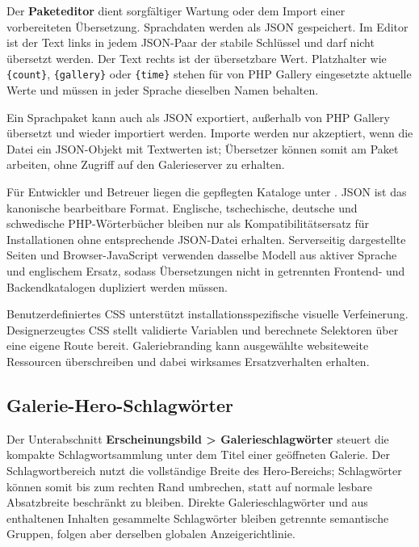 \documentclass[11pt,a4paper]{article}
\newcommand{\filepath}[1]{\path{#1}}
\newcommand{\ui}[1]{\textbf{#1}}
\newcommand{\codeword}[1]{\nolinkurl{#1}}
\begin{document}
Der \ui{Paketeditor} dient sorgfältiger Wartung oder dem Import einer
vorbereiteten Übersetzung. Sprachdaten werden als JSON gespeichert. Im Editor
ist der Text links in jedem JSON-Paar der stabile Schlüssel und darf nicht
übersetzt werden. Der Text rechts ist der übersetzbare Wert. Platzhalter wie
\codeword{\{count\}}, \codeword{\{gallery\}} oder \codeword{\{time\}} stehen für
von PHP Gallery eingesetzte aktuelle Werte und müssen in jeder Sprache dieselben
Namen behalten.

Ein Sprachpaket kann auch als JSON exportiert, außerhalb von PHP Gallery
übersetzt und wieder importiert werden. Importe werden nur akzeptiert, wenn die
Datei ein JSON-Objekt mit Textwerten ist; Übersetzer können somit am Paket
arbeiten, ohne Zugriff auf den Galerieserver zu erhalten.

Für Entwickler und Betreuer liegen die gepflegten Kataloge unter
\filepath{app/lang/}. JSON ist das kanonische bearbeitbare Format. Englische,
tschechische, deutsche und schwedische PHP-Wörterbücher bleiben nur als
Kompatibilitätsersatz für Installationen ohne entsprechende JSON-Datei erhalten.
Serverseitig dargestellte Seiten und Browser-JavaScript verwenden dasselbe
Modell aus aktiver Sprache und englischem Ersatz, sodass Übersetzungen nicht in
getrennten Frontend- und Backendkatalogen dupliziert werden müssen.

Benutzerdefiniertes CSS unterstützt installationsspezifische visuelle
Verfeinerung. Designerzeugtes CSS stellt validierte Variablen und berechnete
Selektoren über eine eigene Route bereit. Galeriebranding kann ausgewählte
websiteweite Ressourcen überschreiben und dabei wirksames Ersatzverhalten
erhalten.

\subsection{Galerie-Hero-Schlagwörter}

Der Unterabschnitt \ui{Erscheinungsbild > Galerieschlagwörter} steuert die
kompakte Schlagwortsammlung unter dem Titel einer geöffneten Galerie. Der
Schlagwortbereich nutzt die vollständige Breite des Hero-Bereichs; Schlagwörter
können somit bis zum rechten Rand umbrechen, statt auf normale lesbare
Absatzbreite beschränkt zu bleiben. Direkte Galerieschlagwörter und aus
enthaltenen Inhalten gesammelte Schlagwörter bleiben getrennte semantische
Gruppen, folgen aber derselben globalen Anzeigerichtlinie.
\end{document}
